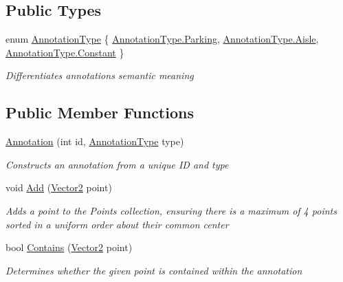 \subsection*{Public Types}
\begin{DoxyCompactItemize}
\item 
enum \mbox{\hyperlink{class_eagle_eye_1_1_models_1_1_annotation_a38b72003ea887909fe12d6382092f7d9}{Annotation\+Type}} \{ \mbox{\hyperlink{class_eagle_eye_1_1_models_1_1_annotation_a38b72003ea887909fe12d6382092f7d9abaaacd7280e91aface947a1cc19d0f79}{Annotation\+Type.\+Parking}}, 
\mbox{\hyperlink{class_eagle_eye_1_1_models_1_1_annotation_a38b72003ea887909fe12d6382092f7d9a8d979b563564c1ec74326370933860b3}{Annotation\+Type.\+Aisle}}, 
\mbox{\hyperlink{class_eagle_eye_1_1_models_1_1_annotation_a38b72003ea887909fe12d6382092f7d9acb17869fe51048b5a5c4c6106551a255}{Annotation\+Type.\+Constant}}
 \}
\begin{DoxyCompactList}\small\item\em Differentiates annotation\textquotesingle{}s semantic meaning \end{DoxyCompactList}\end{DoxyCompactItemize}
\subsection*{Public Member Functions}
\begin{DoxyCompactItemize}
\item 
\mbox{\hyperlink{class_eagle_eye_1_1_models_1_1_annotation_a7dbb2b3cc18d9a83a530bb59172532e8}{Annotation}} (int id, \mbox{\hyperlink{class_eagle_eye_1_1_models_1_1_annotation_a38b72003ea887909fe12d6382092f7d9}{Annotation\+Type}} type)
\begin{DoxyCompactList}\small\item\em Constructs an annotation from a unique ID and type \end{DoxyCompactList}\item 
void \mbox{\hyperlink{class_eagle_eye_1_1_models_1_1_annotation_a47912a5775f0ead932d1cddb43213cd1}{Add}} (\mbox{\hyperlink{struct_eagle_eye_1_1_models_1_1_geometry_1_1_vector2}{Vector2}} point)
\begin{DoxyCompactList}\small\item\em Adds a point to the Points collection, ensuring there is a maximum of 4 points sorted in a uniform order about their common center \end{DoxyCompactList}\item 
bool \mbox{\hyperlink{class_eagle_eye_1_1_models_1_1_annotation_afa6be3269640630b76dce0c9dee1a239}{Contains}} (\mbox{\hyperlink{struct_eagle_eye_1_1_models_1_1_geometry_1_1_vector2}{Vector2}} point)
\begin{DoxyCompactList}\small\item\em Determines whether the given point is contained within the annotation \end{DoxyCompactList}\end{DoxyCompactItemize}

